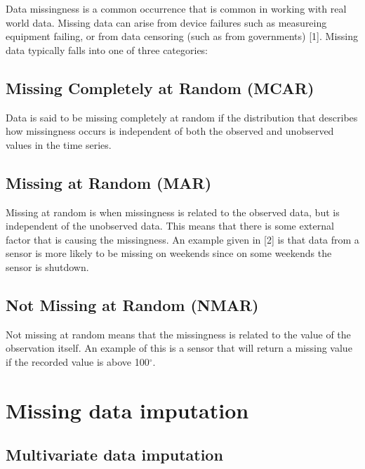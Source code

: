 \documentclass[
]{report}
\begin{document}

Data missingness is a common occurrence that is common in working with
real world data. Missing data can arise from device failures such as
measureing equipment failing, or from data censoring (such as from
governments) {[}1{]}. Missing data typically falls into one of three
categories:

\subsection{Missing Completely at Random
(MCAR)}\label{missing-completely-at-random-mcar}

Data is said to be missing completely at random if the distribution that
describes how missingness occurs is independent of both the observed and
unobserved values in the time series.

\subsection{Missing at Random (MAR)}\label{missing-at-random-mar}

Missing at random is when missingness is related to the observed data,
but is independent of the unobserved data. This means that there is some
external factor that is causing the missingness. An example given in
{[}2{]} is that data from a sensor is more likely to be missing on
weekends since on some weekends the sensor is shutdown.

\subsection{Not Missing at Random
(NMAR)}\label{not-missing-at-random-nmar}

Not missing at random means that the missingness is related to the value
of the observation itself. An example of this is a sensor that will
return a missing value if the recorded value is above 100\(^\circ\).


\section{Missing data imputation}\label{missing-data-imputation}

\subsection{Multivariate data
imputation}\label{multivariate-data-imputation}
\end{document}
